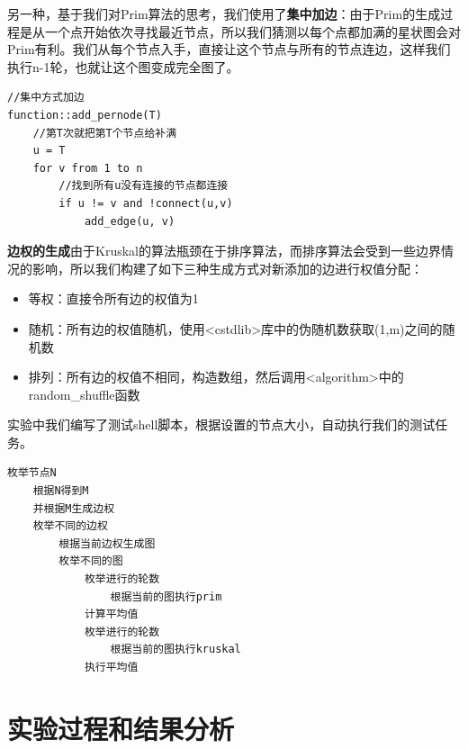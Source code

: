 \documentclass[UTF8]{ctexart}
\begin{document}
另一种，基于我们对Prim算法的思考，我们使用了\textbf{集中加边}：由于Prim的生成过程是从一个点开始依次寻找最近节点，所以我们猜测以每个点都加满的星状图会对Prim有利。我们从每个节点入手，直接让这个节点与所有的节点连边，这样我们执行n-1轮，也就让这个图变成完全图了。
\begin{lstlisting}
//集中方式加边
function::add_pernode(T)
    //第T次就把第T个节点给补满
    u = T
    for v from 1 to n
        //找到所有u没有连接的节点都连接
        if u != v and !connect(u,v)
            add_edge(u, v)
\end{lstlisting}

\noindent\textbf{边权的生成}\quad 由于Kruskal的算法瓶颈在于排序算法，而排序算法会受到一些边界情况的影响，所以我们构建了如下三种生成方式对新添加的边进行权值分配：
\begin{itemize}
    \item 等权：直接令所有边的权值为1
    \item 随机：所有边的权值随机，使用<cstdlib>库中的伪随机数获取(1,m)之间的随机数
    \item 排列：所有边的权值不相同，构造数组，然后调用<algorithm>中的random\_shuffle函数
\end{itemize}

实验中我们编写了测试shell脚本，根据设置的节点大小，自动执行我们的测试任务。
\begin{lstlisting}
枚举节点N   
	根据N得到M
    并根据M生成边权
    枚举不同的边权
        根据当前边权生成图
		枚举不同的图
			枚举进行的轮数
				根据当前的图执行prim
			计算平均值
			枚举进行的轮数
				根据当前的图执行kruskal
			执行平均值
\end{lstlisting}

\section{实验过程和结果分析}
\end{document}
